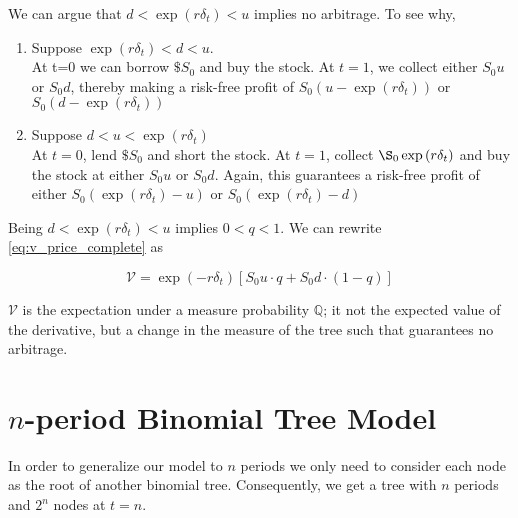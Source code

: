 \documentclass{article}
\begin{document}
We can argue that $d < \exp{(r\delta_t)} < u$ implies no arbitrage. To see why, 
\begin{enumerate}
\item Suppose $\exp{(r\delta_t)} < d < u$.\\
    At t=0 we can borrow $\$S_0$ and buy the stock. At $t=1$, we collect either $S_0u$ or $S_0d$, thereby making a risk-free profit of $S_0(u - \exp{(r\delta_t)})$ or $S_0(d - \exp{(r\delta_t)})$

\item Suppose $d < u < \exp{(r\delta_t)}$\\
    At $t=0$, lend $\$S_0$ and short the stock. At $t=1$, collect $\S_0\exp{(r\delta_t)}$ and buy the stock at either $S_0u$ or $S_0d$. Again, this guarantees a risk-free profit of either $S_0(\exp{(r\delta_t)} - u)$ or $S_0(\exp{(r\delta_t)} - d)$
\end{enumerate}

Being $d < \exp{(r\delta_t)} < u$ implies $0 < q < 1$. We can rewrite \ref{eq:v_price_complete} as

\begin{equation} \label{eq:v_price}
    \mathcal{V} = \exp{(-r\delta_t)}[S_0u\cdot q + S_0d \cdot (1-q)]
\end{equation}

$\mathcal V$ is the expectation under a measure probability $\mathbb Q$; it not the expected value of the derivative, but a change in the measure of the tree such that guarantees no arbitrage.

\section{$n$-period Binomial Tree Model}
In order to generalize our model to $n$ periods we only need to consider each node as the root of another binomial tree. Consequently, we get a tree with $n$ periods and $2^n$ nodes at $t=n$.
\end{document}
